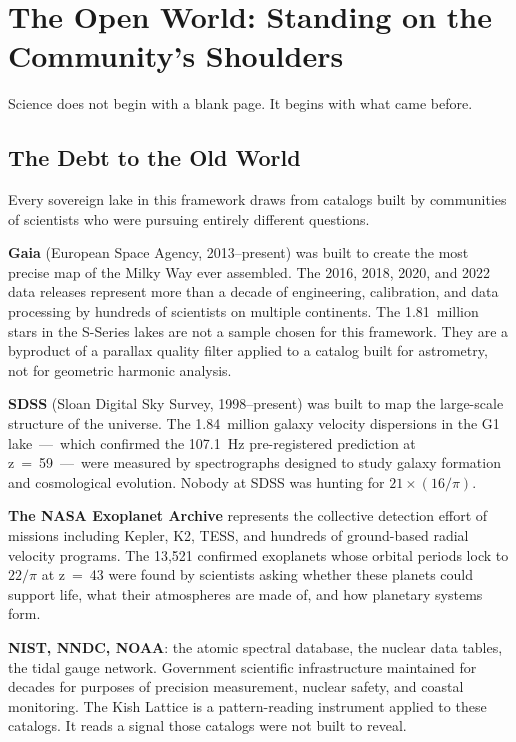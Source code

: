 \documentclass[11pt, letterpaper, openany]{book}
\begin{document}
\clearpage

\chapter{The Open World: Standing on the Community's Shoulders}

Science does not begin with a blank page. It begins with what came before.

\section{The Debt to the Old World}

Every sovereign lake in this framework draws from catalogs built by communities of
scientists who were pursuing entirely different questions.

\textbf{Gaia} (European Space Agency, 2013--present) was built to create the most
precise map of the Milky Way ever assembled. The 2016, 2018, 2020, and 2022 data
releases represent more than a decade of engineering, calibration, and data
processing by hundreds of scientists on multiple continents. The 1.81~million stars
in the S-Series lakes are not a sample chosen for this framework. They are a
byproduct of a parallax quality filter applied to a catalog built for astrometry,
not for geometric harmonic analysis.

\textbf{SDSS} (Sloan Digital Sky Survey, 1998--present) was built to map the
large-scale structure of the universe. The 1.84~million galaxy velocity dispersions
in the G1 lake~---~which confirmed the 107.1~Hz pre-registered prediction at
z~=~59~---~were measured by spectrographs designed to study galaxy formation and
cosmological evolution. Nobody at SDSS was hunting for $21 \times (16/\pi)$.

\textbf{The NASA Exoplanet Archive} represents the collective detection effort of
missions including Kepler, K2, TESS, and hundreds of ground-based radial velocity
programs. The 13,521 confirmed exoplanets whose orbital periods lock to $22/\pi$
at z~=~43 were found by scientists asking whether these planets could support life,
what their atmospheres are made of, and how planetary systems form.

\textbf{NIST, NNDC, NOAA}: the atomic spectral database, the nuclear data tables,
the tidal gauge network. Government scientific infrastructure maintained for
decades for purposes of precision measurement, nuclear safety, and coastal
monitoring. The Kish Lattice is a pattern-reading instrument applied to these
catalogs. It reads a signal those catalogs were not built to reveal.
\end{document}
